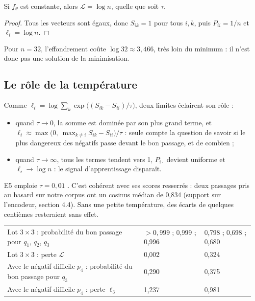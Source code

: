 \begin{proposition}\label{prop:effondrement}
Si $f_\theta$ est constante, alors $\mathcal{L} = \log n$, quelle que soit $\tau$.
\end{proposition}

\begin{proof}
Tous les vecteurs sont égaux, donc $S_{ik} = 1$ pour tous $i, k$, puis $P_{ii} = 1/n$ et $\ell_i = \log n$.
\end{proof}

Pour $n = 32$, l'effondrement coûte $\log 32 \approx 3{,}466$, très loin du minimum : il n'est donc pas une
solution de la minimisation.

\subsection{Le rôle de la température}

Comme $\ell_i = \log \sum_k \exp\big((S_{ik} - S_{ii})/\tau\big)$, deux limites éclairent son rôle :
\begin{itemize}
\item quand $\tau \to 0$, la somme est dominée par son plus grand terme, et
  $\ell_i \approx \max\big(0,\ \max_{k \neq i} S_{ik} - S_{ii}\big)/\tau$ : seule compte la question de savoir si le
  plus dangereux des négatifs passe devant le bon passage, et de combien ;
\item quand $\tau \to \infty$, tous les termes tendent vers 1, $P_{i\cdot}$ devient uniforme et $\ell_i \to \log n$ :
  le signal d'apprentissage disparaît.
\end{itemize}
E5 emploie $\tau = 0{,}01$ \source. C'est cohérent avec ses scores resserrés : deux passages pris au hasard sur notre
corpus ont un cosinus médian de 0,834 \mesure (support sur l'encodeur, section 4.4). Sans une petite température, des
écarts de quelques centièmes resteraient sans effet.

\begin{tabletype}
\begin{tabularx}{\textwidth}{@{}YR{2.7cm}R{2.7cm}@{}}
\toprule
{} &  &  \\
\midrule
Lot $3 \times 3$ : probabilité du bon passage pour $q_1$, $q_2$, $q_3$ & $>0{,}999$ ; 0,999 ; 0,996 & 0,798 ; 0,698 ; 0,680 \\
Lot $3 \times 3$ : perte $\mathcal{L}$ & 0,002 & 0,324 \\
Avec le négatif difficile $p_4$ : probabilité du bon passage pour $q_3$ & 0,290 & 0,375 \\
Avec le négatif difficile $p_4$ : perte $\ell_3$ & 1,237 & 0,981 \\
\bottomrule
\end{tabularx}
\end{tabletype}


